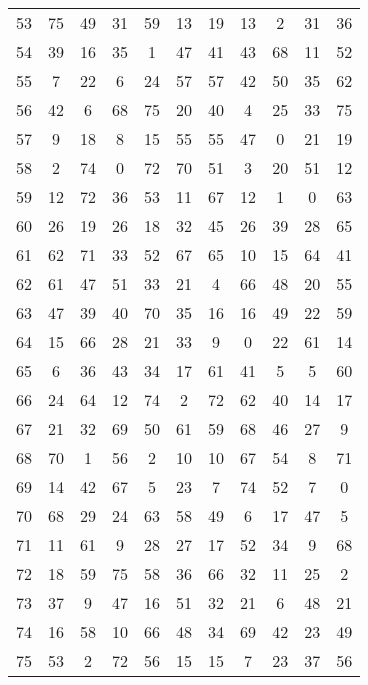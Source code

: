 \begin{table}
\begin{tabular}{c c c c c c c c c c c }
53 & 75 & 49 & 31 & 59 & 13 & 19 & 13 & 2 & 31 & 36 \\
54 & 39 & 16 & 35 & 1 & 47 & 41 & 43 & 68 & 11 & 52 \\
55 & 7 & 22 & 6 & 24 & 57 & 57 & 42 & 50 & 35 & 62 \\
56 & 42 & 6 & 68 & 75 & 20 & 40 & 4 & 25 & 33 & 75 \\
57 & 9 & 18 & 8 & 15 & 55 & 55 & 47 & 0 & 21 & 19 \\
58 & 2 & 74 & 0 & 72 & 70 & 51 & 3 & 20 & 51 & 12 \\
59 & 12 & 72 & 36 & 53 & 11 & 67 & 12 & 1 & 0 & 63 \\
60 & 26 & 19 & 26 & 18 & 32 & 45 & 26 & 39 & 28 & 65 \\
61 & 62 & 71 & 33 & 52 & 67 & 65 & 10 & 15 & 64 & 41 \\
62 & 61 & 47 & 51 & 33 & 21 & 4 & 66 & 48 & 20 & 55 \\
63 & 47 & 39 & 40 & 70 & 35 & 16 & 16 & 49 & 22 & 59 \\
64 & 15 & 66 & 28 & 21 & 33 & 9 & 0 & 22 & 61 & 14 \\
65 & 6 & 36 & 43 & 34 & 17 & 61 & 41 & 5 & 5 & 60 \\
66 & 24 & 64 & 12 & 74 & 2 & 72 & 62 & 40 & 14 & 17 \\
67 & 21 & 32 & 69 & 50 & 61 & 59 & 68 & 46 & 27 & 9 \\
68 & 70 & 1 & 56 & 2 & 10 & 10 & 67 & 54 & 8 & 71 \\
69 & 14 & 42 & 67 & 5 & 23 & 7 & 74 & 52 & 7 & 0 \\
70 & 68 & 29 & 24 & 63 & 58 & 49 & 6 & 17 & 47 & 5 \\
71 & 11 & 61 & 9 & 28 & 27 & 17 & 52 & 34 & 9 & 68 \\
72 & 18 & 59 & 75 & 58 & 36 & 66 & 32 & 11 & 25 & 2 \\
73 & 37 & 9 & 47 & 16 & 51 & 32 & 21 & 6 & 48 & 21 \\
74 & 16 & 58 & 10 & 66 & 48 & 34 & 69 & 42 & 23 & 49 \\
75 & 53 & 2 & 72 & 56 & 15 & 15 & 7 & 23 & 37 & 56 \\
\hline
\end{tabular}
\end{table}